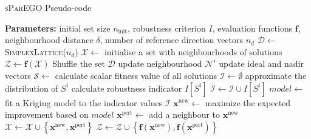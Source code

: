 \documentclass[10pt]{llncs}
\newcommand{\brr}[1]{{\left({#1}\right)}} %
\newcommand{\brf}[1]{\left\lbrace{#1}\right\rbrace} %
\newcommand{\I}[1]{I\!\left[{#1}\right]} %
\newcommand{\vx}{\mathbf{x}} %
\newcommand{\vf}{\mathbf{f}} %
\newcommand{\vd}{\mathbf{d}} %
\newcommand{\DSet}{\mathcal{D}} %
\newcommand{\NSet}{\mathcal{N}} %
\newcommand{\XSet}{\mathcal{X}} %
\newcommand{\ZSet}{\mathcal{Z}} %
\newcommand{\SSet}{\mathcal{S}} %
\newcommand{\ISet}{\mathcal{I}} %
\begin{document}
\begin{algorithm}
\caption{\textsc{sParEGO} Pseudo-code}
\label{alg:sParEGO}
\begin{algorithmic}[1]
	\Statex \textbf{Parameters:} initial set size $n_\text{init}$, robustness criterion $I$, 
	\Statex \hspace{20mm} evaluation functions $\vf$, neighbourhood distance $\delta$,
	\Statex \hspace{20mm} number of reference direction vectors $n_d$
	\State $\DSet \leftarrow$ \textsc{SimplexLattice}($n_d$) 
	\State $\XSet \leftarrow$ initialise a set with neighbourhoods of solutions 
	\State $\ZSet \leftarrow \vf\brr{\XSet}$ 
		\State Shuffle the set $\DSet$
		\ForAll{$\vd\in\DSet$}
			\ForAll{$\vx^i\in\XSet$}
				\State update neighbourhood $\NSet^i$ 
			\EndFor
			\State update ideal and nadir vectors
			\State $\SSet \leftarrow$ calculate scalar fitness value of all solutions 
			\State $\ISet \leftarrow \emptyset$
			\ForAll{$\vx^i\in\XSet$}
				\State approximate the distribution of $S^i$ 
				\State calculate robustness indicator $\I{S^i}$ 
				\State $\ISet \leftarrow \ISet \cup \I{S^i}$
			\EndFor
			\State $model \leftarrow$ fit a Kriging model to the indicator values $\ISet$ 
			\State $\vx^\text{new} \leftarrow$ maximize the expected improvement based on $model$
			\State $\vx^\text{pert} \leftarrow$ add a neighbour to $\vx^\text{new}$  
			\State $\XSet \leftarrow \XSet \cup \brf{\vx^\text{new}, \vx^\text{pert}}$
			\State $\ZSet \leftarrow \ZSet \cup \brf{\vf\brr{\vx^\text{new}}, \vf\brr{\vx^\text{pert}}}$ 
		\EndFor
	\EndWhile
\end{algorithmic}
\end{algorithm}
\end{document}
